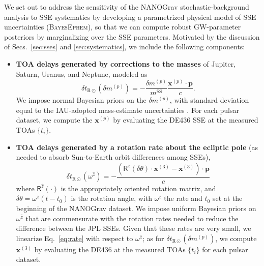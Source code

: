 \documentclass[iop,apj,twocolappendix]{emulateapj}
\begin{document}
We set out to address the sensitivity of the NANOGrav stochastic-background analysis to SSE systematics by developing a parametrized physical model of SSE uncertainties (\textsc{BayesEphem}), so that we can compute robust GW-parameter posteriors by marginalizing over the SSE parameters. 
Motivated by the discussion of Secs.\ \ref{sec:sses} and \ref{sec:systematics}, we include the following components:
%
\begin{itemize} %
%
\item \textbf{TOA delays generated by corrections to the masses} of Jupiter, Saturn, Uranus, and Neptune, modeled as \cite{2010ApJ...720L.201C}
%
\begin{equation}
\label{eq:massperturb}
    \delta t_{\mathrm{R}\odot}(\delta m^{(p)}) = -\frac{\delta m^{(p)}}{m^\mathrm{SS}} \frac{\mathbf{x}^{(p)} \cdot \mathbf{p}}{c}.
\end{equation}
%
We impose normal Bayesian priors on the $\delta m^{(p)}$, with standard deviation equal to the IAU-adopted mass-estimate uncertainties \citep{iaumasses}. For each pulsar dataset, we compute the $\mathbf{x}^{(p)}$ by evaluating the DE436 SSE at the measured TOAs $\{t_i\}$.
%
\item \textbf{TOA delays generated by a rotation rate about the ecliptic pole} (as needed to absorb Sun-to-Earth orbit differences among SSEs),
\begin{equation}
\label{eq:rate}
    \delta t_{\mathrm{R}\odot}(\omega^{\hat{z}}) =
    -\frac{(\mathsf{R}^{\hat{z}}(\delta \theta) \cdot \mathbf{x}^{(3)} - \mathbf{x}^{(3)}) \cdot \mathbf{p}}{c} 
\end{equation}
%
where $\mathsf{R}^{\hat{z}}(\cdot)$ is the appropriately oriented rotation matrix, and $\delta \theta = \omega^{\hat{z}} (t - t_0)$ is the rotation angle, with $\omega^{\hat{z}}$ the rate and $t_0$ set at the beginning of the NANOGrav dataset.
We impose uniform Bayesian priors on $\omega^{\hat{z}}$ that are commensurate with the rotation rates needed to reduce the difference between the JPL SSEs. 
Given that these rates are very small, we linearize Eq.\ \eqref{eq:rate} with respect to $\omega^{\hat{z}}$; as for $\delta t_{\mathrm{R}\odot}(\delta m^{(p)})$, we compute $\mathbf{x}^{(3)}$ by evaluating the DE436 at the measured TOAs $\{t_i\}$ for each pulsar dataset.


\end{itemize}
\end{document}

